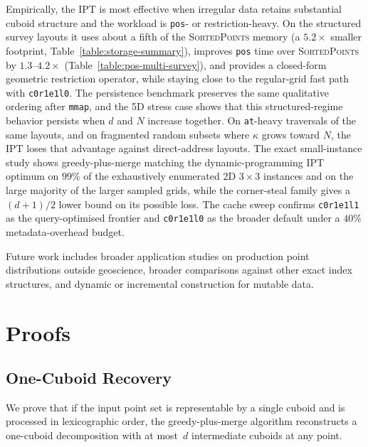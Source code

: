 \documentclass[manuscript,screen,review]{acmart}
\theoremstyle{definition}
\theoremstyle{plain}
\begin{document}
Empirically, the IPT is most effective when irregular data retains
substantial cuboid structure and the workload is
\texttt{pos}- or restriction-heavy. On the structured survey layouts
it uses about a fifth of the \textsc{SortedPoints} memory (a
$5.2\times$ smaller footprint, Table~\ref{table:storage-summary}),
improves \texttt{pos} time over \textsc{SortedPoints} by
$1.3$--$4.2\times$ (Table~\ref{table:pos-multi-survey}), and provides a
closed-form geometric restriction operator, while staying close to the
regular-grid fast path with \texttt{c0r1e1l0}. The persistence benchmark preserves
the same qualitative ordering after \texttt{mmap}, and the 5D stress
case shows that this structured-regime behavior persists when $d$ and
$N$ increase together. On \texttt{at}-heavy traversals of the same
layouts, and on fragmented random subsets where $\kappa$ grows toward
$N$, the IPT loses that advantage against direct-address layouts.
The exact small-instance study shows greedy-plus-merge matching the
dynamic-programming IPT optimum on $99\%$ of the exhaustively enumerated
2D $3\times3$ instances and on the large majority of the larger sampled
grids, while the corner-steal family gives a $(d+1)/2$ lower bound
on its possible loss. The cache sweep confirms \texttt{c0r1e1l1} as the
query-optimised frontier and \texttt{c0r1e1l0} as the broader default
under a $40\%$ metadata-overhead budget.

Future work includes broader application studies on production point
distributions outside geoscience, broader comparisons against other
exact index structures, and dynamic or incremental construction for
mutable data.

\appendix

\section{Proofs}

\subsection{One-Cuboid Recovery}
\label{proof:one-cuboid-recovery}

We prove that if the input point set is representable by a single cuboid and is processed in lexicographic order, the greedy-plus-merge algorithm reconstructs a one-cuboid decomposition with at most~$d$ intermediate cuboids at any point.
\end{document}
